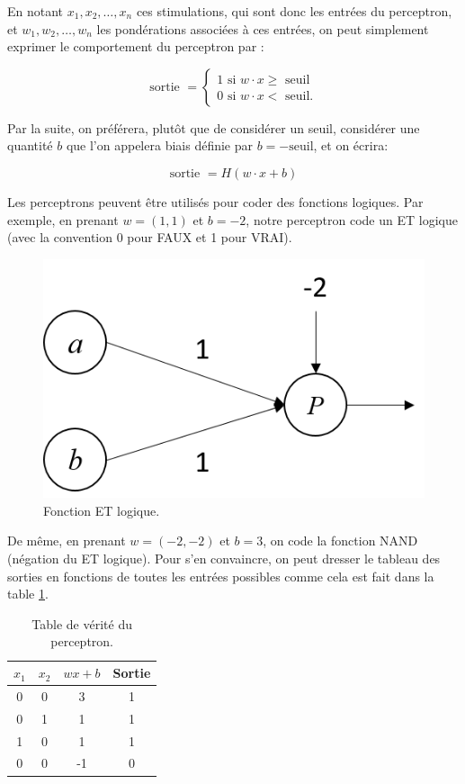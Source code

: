 En notant $x_1, x_2, \dots, x_n$ ces stimulations, qui sont donc les entrées du perceptron, et 
$w_1, w_2, \dots, w_n$ les pondérations associées à ces entrées, on peut simplement exprimer le 
comportement du perceptron par :

\[
\text{sortie } =
\begin{cases}
 1 \text{ si } w \cdot x  \geq \text{ seuil} \\
 0 \text{ si } w \cdot x  < \text{ seuil.} 
 \end{cases}
\]

Par la suite, on préférera, plutôt que de considérer un seuil, considérer 
une quantité $b$ que l'on appelera biais définie par $b = -\text{seuil}$, et on écrira:

\[
\text{sortie } = H(w \cdot x + b)
\]

Les perceptrons peuvent être utilisés pour coder des fonctions logiques. 
Par exemple, en prenant $w = (1, 1)$ et $b = -2$, notre perceptron code 
un ET logique (avec la convention 0 pour FAUX et 1 pour VRAI).

\begin{figure}[h]
  \centering
  \includegraphics[scale=0.5]{assets/and-perceptron}
  \caption{Fonction ET logique.}
  \label{fig:and-perceptron}
\end{figure}

De même, en prenant $w = (-2, -2)$ et $b = 3$, on code la fonction NAND 
(négation du ET logique). Pour s'en convaincre, on peut dresser le tableau 
des sorties en fonctions de toutes les entrées possibles comme cela est fait 
dans la table \ref{table:nand-perceptron}.

\begin{table}[h]
  \centering
\begin{tabular}{|c|c|c|c|}
\hline
$x_1$ & $x_2$ & $wx + b$ & Sortie \\
\hline
0     & 0     & 3        & 1 \\  
0     & 1     & 1        & 1 \\  
1     & 0     & 1        & 1 \\  
0     & 0     & -1       & 0 \\   
\hline
\end{tabular} 
  \caption{Table de vérité du perceptron.}
  \label{table:nand-perceptron}
\end{table}

